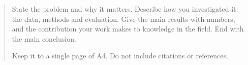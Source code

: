 \begin{abstract}
State the problem and why it matters. Describe how you investigated it: the data, methods
and evaluation. Give the main results with numbers, and the contribution your work makes to
knowledge in the field. End with the main conclusion.

Keep it to a single page of A4. Do not include citations or references.
\end{abstract}
